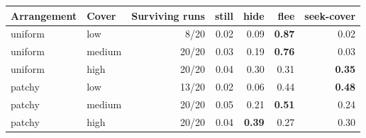 \begin{tabular}{llrrrrr}
\toprule
Arrangement & Cover & Surviving runs & still & hide & flee & seek-cover \\
\midrule
uniform & low & 8/20 & 0.02 & 0.09 & \textbf{0.87} & 0.02 \\
uniform & medium & 20/20 & 0.03 & 0.19 & \textbf{0.76} & 0.03 \\
uniform & high & 20/20 & 0.04 & 0.30 & 0.31 & \textbf{0.35} \\
patchy & low & 13/20 & 0.02 & 0.06 & 0.44 & \textbf{0.48} \\
patchy & medium & 20/20 & 0.05 & 0.21 & \textbf{0.51} & 0.24 \\
patchy & high & 20/20 & 0.04 & \textbf{0.39} & 0.27 & 0.30 \\
\bottomrule
\end{tabular}
